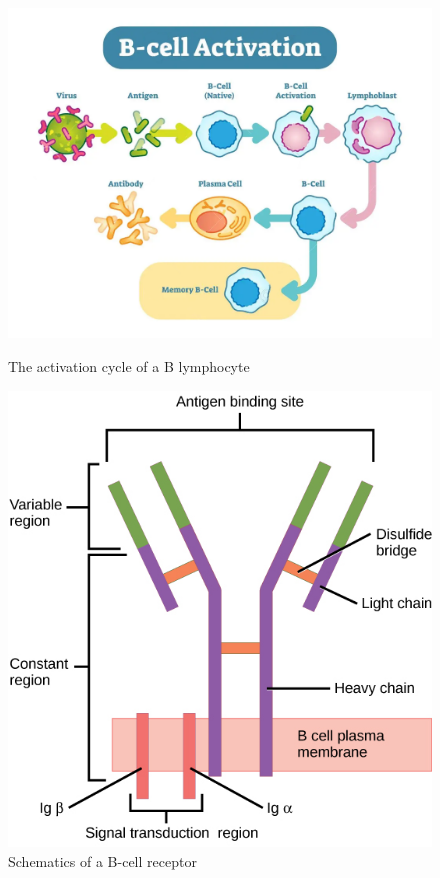 \begin{figure}[H]
    \begin{minipage}{0.59\textwidth}
        \centering
        \includegraphics[width=\textwidth]{../Images/lymphocyte_b.png}
        \caption{The activation cycle of a B lymphocyte}
        \label{fig:B-cell_activation}
    \end{minipage}\hfill
    \begin{minipage}{0.39\textwidth}
        \centering
        \includegraphics[width=\textwidth]{../Images/B-cell_receptor.jpg}   
        \caption{Schematics of a B-cell receptor}
        \label{fig:B-cell_receptor}
    \end{minipage}
\end{figure}

